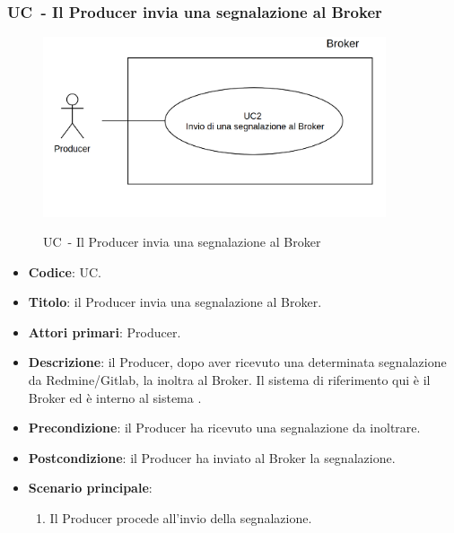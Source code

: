 \subsubsection{UC\theuccount\ - Il Producer invia una segnalazione al Broker}
	\begin{figure}[H]
		\centering
		\includegraphics[width=0.9\textwidth]{img/UC2.png}\\
		\caption{UC\theuccount\ - Il Producer invia una segnalazione al Broker}
	\end{figure}
	\begin{itemize}
		\item \textbf{Codice}: UC\theuccount.
		\item \textbf{Titolo}: il Producer invia una segnalazione al Broker.
		\item \textbf{Attori primari}: Producer.
		\item \textbf{Descrizione}: il Producer, dopo aver ricevuto una determinata segnalazione da Redmine/Gitlab, la inoltra al Broker. Il sistema di riferimento qui è il Broker ed è interno al sistema \progetto.
		\item \textbf{Precondizione}: il Producer ha ricevuto una segnalazione da inoltrare.
		\item \textbf{Postcondizione}: il Producer ha inviato al Broker la segnalazione.
		\item \textbf{Scenario principale}:
		\begin{enumerate}
			\item Il Producer procede all'invio della segnalazione.
		\end{enumerate}
		 
	\end{itemize}

